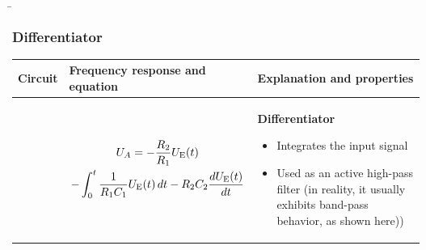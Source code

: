 
\begin{frame}
    \b{
    \frametitle{Differentiator}
    \centering
    \begin{table}[ht]
    \label{tab:Differenzierer}
    \begin{tabular}{|m{}|m{}|m{}|}
    \hline
    Circuit & Frequency response and equation & Explanation and properties\\ %
    \hline
    \vspace{0.5cm}
    \centering
    
    &
    \begin{center}
    
    \begin{multline*}
        U_A = - \frac{R_2}{R_1} U_{\textnormal{E}}(t) \\
        - \int_0^t \frac{1}{R_1 C_1} U_{\textnormal{E}}(t) \, dt 
        - R_2 C_2\frac{dU_{\textnormal{E}}(t)}{dt}
    \end{multline*}
    \end{center} 
    & 
    \textbf{Differentiator}\newline
    \begin{itemize}
        \item Integrates the input signal
        \item Used as an active high-pass filter (in reality, it usually exhibits band-pass behavior, as shown here))
    \end{itemize} \\
    \hline
    \end{tabular}
    \end{table}
    }
\end{frame}


